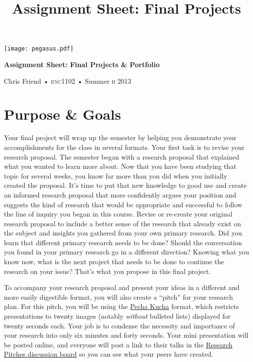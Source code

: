\documentclass[10pt,oneside]{amsart}	%
\title[Final Projects]{Assignment Sheet: Final Projects}
\begin{document}
%
\thispagestyle{empty}

\vspace{-2in}
\begin{center}
\huge
{\texttt{[image: pegasus.pdf]}}

\textbf{Assignment Sheet: Final Projects \& Portfolio}

{\normalsize Chris Friend • \textsc{enc1102} • Summer \textsc{b} 2013}
\end{center}
\vspace{1.5\baselineskip}

\section{Purpose \& Goals} %
\label{sec:purpose}
Your final project will wrap up the semester by helping you demonstrate your accomplishments for the class in several formats. Your first task is to revise your research proposal. The semester began with a research proposal that explained what you wanted to learn more about. Now that you have been studying that topic for several weeks, you know far more than you did when you initially created the proposal. It's time to put that new knowledge to good use and create an informed research proposal that more confidently argues your position and suggests the kind of research that would be appropriate and successful to follow the line of inquiry you began in this course. Revise or re-create your original research proposal to include a better sense of the research that already exist on the subject and insights you gathered from your own primary research. Did you learn that different primary research needs to be done? Should the conversation you found in your primary research go in a different direction? Knowing what you know now, what is the next project that needs to be done to continue the research on your issue? That's what you propose in this final project.

To accompany your research proposal and present your ideas in a different and more easily digestible format, you will also create a ``pitch'' for your research plan. For this pitch, you will be using the \href{http://www.pechakucha.org}{Pecha Kucha} format, which restricts presentations to twenty images (notably \emph{without} bulleted lists) displayed for twenty seconds each. Your job is to condense the necessity and importance of your research into only six minutes and forty seconds. Your mini presentation will be posted online, and everyone will post a link to their talks in the \href{https://webcourses2c.instructure.com/courses/982699/discussion_topics/1903125}{Research Pitches discussion board} so you can see what your peers have created.
\end{document}
